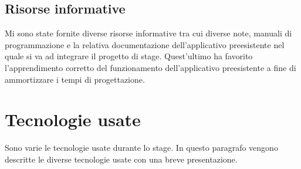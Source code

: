 \subsection{Risorse informative}
Mi sono state fornite diverse risorse informative tra cui diverse note, manuali di programmazione  e la relativa documentazione dell'applicativo preesistente nel quale si va ad integrare il progetto di stage. Quest'ultimo ha favorito l'apprendimento corretto del funzionamento dell'applicativo preesistente a fine di ammortizzare i tempi di progettazione. 

\section{Tecnologie usate}
Sono varie le tecnologie usate durante lo stage. In questo paragrafo vengono descritte le diverse tecnologie usate con una breve presentazione. \\\\

